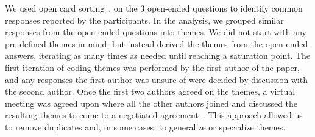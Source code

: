 
We used open card sorting~\cite{zimmermann2016card}, on the 3 open-ended questions to identify common responses reported by the participants.
In the analysis, we grouped similar responses from the open-ended questions into themes.
We did not start with any pre-defined themes in mind, but instead derived the themes from the open-ended answers, iterating as many times as needed until reaching a saturation point. The first iteration of coding themes was performed by the first author of the paper, and any responses the first author was unsure of were decided by discussion with the second author. Once the first two authors agreed on the themes, a virtual meeting was agreed upon where all the other authors joined and discussed the resulting themes to come to a negotiated agreement~\cite{Garrison:2006}. This approach allowed us to remove duplicates and, in some cases, to generalize or specialize themes.%
